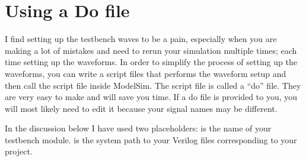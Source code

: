 \chapter{Using a Do file}
\graphicspath{ {./Lab00HowTo/howTo30 Using Do Files/Fig} }


I find setting up the testbench waves to be a pain, especially when you
are making a lot of mistakes and need to rerun your simulation multiple
times; each time setting up the waveforms. In order to simplify the
process of setting up the waveforms, you can write a script files that
performs the waveform setup and then call the script file inside
ModelSim. The script file is called a ``do'' file. They are very easy to
make and will save you time. If a do file is provided to you, you will
most likely need to edit it because your signal names may be different.

In the discussion below I have used two placeholders:
 is the name of your testbench module.
 is the system path to your
Verilog files corresponding to your project.

